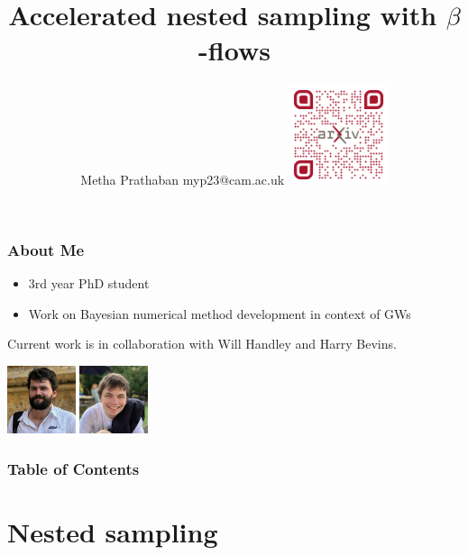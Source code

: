 \documentclass[aspectratio=169]{beamer}
\title[Accelerated nested sampling with $\beta$-flows for gravitational waves] %
{Accelerated nested sampling with $\beta$-flows}
\author[Metha Prathaban] %
{Metha Prathaban \break myp23@cam.ac.uk \break \vfill\includegraphics[width=0.22\textwidth]{Ca_Foscari Beamer/qr-code.png}}
\date{}
\def \bblock{\begin{beamerboxesrounded}[upper=uppercolor,lower=lowercolor,shadow=true]}
\def \eblock{\end{beamerboxesrounded}}
\begin{document}
\frame{\titlepage}
\begin{frame}
\frametitle{About Me}
\begin{itemize}
    \item 3rd year PhD student
    \item Work on Bayesian numerical method development in context of GWs
\end{itemize}
\vspace{2em}
\bblock{\begin{center}
Current work is in collaboration with Will Handley and Harry Bevins.
\end{center}}
\begin{center}
\includegraphics[height=2.0cm]{Ca_Foscari Beamer/will_handley.jpg}
\includegraphics[height=2.0cm]{Ca_Foscari Beamer/harry_bevins.jpg}
\end{center}
\eblock
\end{frame}
\begin{frame}
\frametitle{Table of Contents}
\tableofcontents
\end{frame}


\section{Nested sampling}
\end{document}

